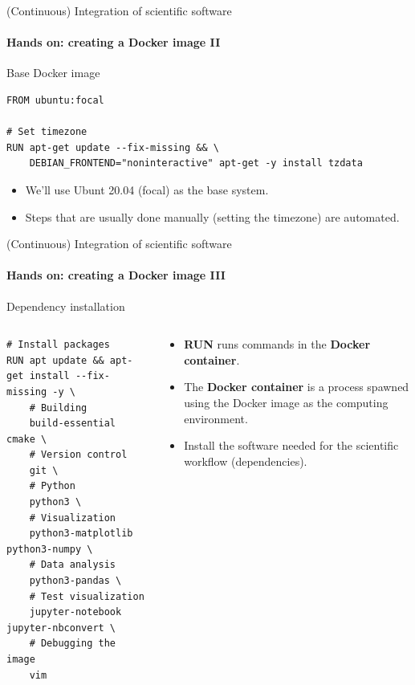 \begin{frame}[fragile]{(Continuous) Integration of scientific software} 
    \framesubtitle{Hands on: creating a Docker image II} 
    \vfill

    Base Docker image

    \begin{verbatim}
FROM ubuntu:focal 

# Set timezone
RUN apt-get update --fix-missing && \
    DEBIAN_FRONTEND="noninteractive" apt-get -y install tzdata
    \end{verbatim}

    \begin{itemize}
        \item We'll use Ubunt 20.04 (focal) as the base system.
        \item Steps that are usually done manually (setting the timezone) are automated. 
    \end{itemize}

\end{frame}

\begin{frame}[fragile]{(Continuous) Integration of scientific software} 
    \framesubtitle{Hands on: creating a Docker image III} 
    \vfill

    Dependency installation 

    \begin{columns}
        \begin{column}[c]{0.5\textwidth}
    \begin{verbatim}
# Install packages
RUN apt update && apt-get install --fix-missing -y \
    # Building
    build-essential cmake \
    # Version control
    git \
    # Python
    python3 \ 
    # Visualization
    python3-matplotlib python3-numpy \
    # Data analysis
    python3-pandas \
    # Test visualization
    jupyter-notebook jupyter-nbconvert \
    # Debugging the image 
    vim  
    \end{verbatim}
        \end{column}
        \begin{column}[c]{0.5\textwidth}
            \begin{itemize}
                \item \textbf{RUN} runs commands in the \textbf{Docker container}. 
                \item The \textbf{Docker container} is a process spawned using the Docker image as the computing environment.
                \item Install the software needed for the scientific workflow (dependencies).
            \end{itemize}
        \end{column}
    \end{columns}


\end{frame}

